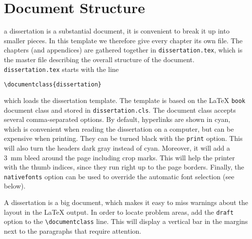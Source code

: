 \section{Document Structure}

 a dissertation is a substantial document, it is convenient to break it up into smaller pieces. In this template we therefore give every chapter its own file. The chapters (and appendices) are gathered together in \texttt{dissertation.tex}, which is the master file describing the overall structure of the document. \texttt{dissertation.tex} starts with the line

\begin{verbatim}
\documentclass{dissertation}
\end{verbatim}
which loads the dissertation template. The template is based on the \LaTeX{} \texttt{book} document class and stored in \texttt{dissertation.cls}. The document class accepts several comma-separated options. By default, hyperlinks are shown in cyan, which is convenient when reading the dissertation on a computer, but can be expensive when printing. They can be turned black with the \texttt{print} option. This will also turn the headers dark gray instead of cyan. Moreover, it will add a 3~mm bleed around the page including crop marks. This will help the printer with the thumb indices, since they run right up to the page borders. Finally, the \texttt{nativefonts} option can be used to override the automatic font selection (see below).

A dissertation is a big document, which makes it easy to miss warnings about the layout in the \LaTeX{} output. In order to locate problem areas, add the \texttt{draft} option to the \verb|\documentclass| line. This will display a vertical bar in the margins next to the paragraphs that require attention.

